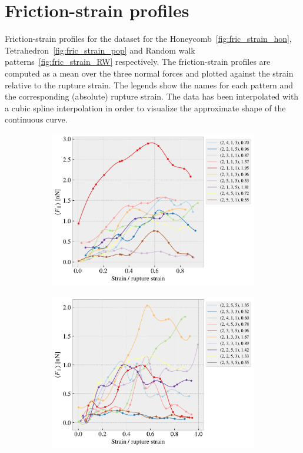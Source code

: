 \chapter{Friction-strain profiles}\label{sec:data_stretch_profiles}
Friction-strain profiles for the dataset for the Honeycomb~\cref{fig:fric_strain_hon}, Tetrahedron~\cref{fig:fric_strain_pop} and Random walk patterns~\cref{fig:fric_strain_RW} respectively. The friction-strain profiles are computed as a mean over the three normal forces and plotted against the strain relative to the rupture strain. The legends show the names for each pattern and the corresponding (absolute) rupture strain. The data has been interpolated with a cubic spline interpolation in order to visualize the approximate shape of the continuous curve.


\begin{figure}[H]
    \centering
    \begin{subfigure}[b]{0.49\textwidth}
        \centering
        \includegraphics[width=\textwidth]{figures/stretch_profiles/honeycomb/SP_0_honeycomb.pdf}
        \caption{}
    \end{subfigure}
    \hfill
    \begin{subfigure}[b]{0.49\textwidth}
        \centering
        \includegraphics[width=\textwidth]{figures/stretch_profiles/honeycomb/SP_1_honeycomb.pdf}

\end{subfigure}
\end{figure}
